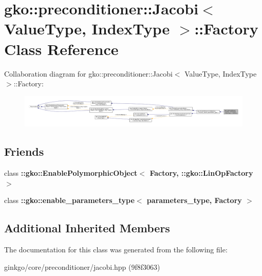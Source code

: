 \hypertarget{classgko_1_1preconditioner_1_1Jacobi_1_1Factory}{}\section{gko\+:\+:preconditioner\+:\+:Jacobi$<$ Value\+Type, Index\+Type $>$\+:\+:Factory Class Reference}
\label{classgko_1_1preconditioner_1_1Jacobi_1_1Factory}


Collaboration diagram for gko\+:\+:preconditioner\+:\+:Jacobi$<$ Value\+Type, Index\+Type $>$\+:\+:Factory\+:
\nopagebreak
\begin{figure}[H]
\begin{center}
\leavevmode
\includegraphics[width=350pt]{classgko_1_1preconditioner_1_1Jacobi_1_1Factory__coll__graph}
\end{center}
\end{figure}
\subsection*{Friends}
\begin{DoxyCompactItemize}
\item 
\mbox{\label{classgko_1_1preconditioner_1_1Jacobi_1_1Factory_a27e9bbc94a1c1c59f40833153eda8f78}} 
class {\bfseries \+::gko\+::\+Enable\+Polymorphic\+Object$<$ Factory, \+::gko\+::\+Lin\+Op\+Factory $>$}
\item 
\mbox{\label{classgko_1_1preconditioner_1_1Jacobi_1_1Factory_a0d176cbd42d6214e11aee8c30ca256fc}} 
class {\bfseries \+::gko\+::enable\+\_\+parameters\+\_\+type$<$ parameters\+\_\+type, Factory $>$}
\end{DoxyCompactItemize}
\subsection*{Additional Inherited Members}


The documentation for this class was generated from the following file\+:\begin{DoxyCompactItemize}
\item 
ginkgo/core/preconditioner/jacobi.\+hpp (9f8f3063)\end{DoxyCompactItemize}
